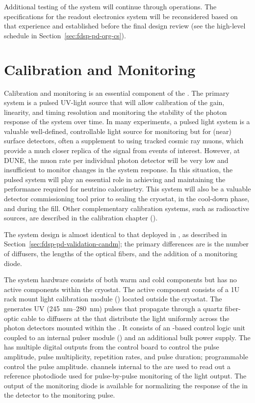 Additional testing of the system will continue through  operations. The specifications for the readout electronics system will be reconsidered based on that experience and established before the  final design review (see the high-level schedule in Section~\ref{sec:fdsp-pd-org-cs}). 


\section{Calibration and Monitoring}
\label{sec:fdsp-pd-CandM}

Calibration and monitoring is an essential component of the .
The primary system is a pulsed UV-light source that will allow calibration of the  gain, linearity, and timing resolution and monitoring the stability of the photon response of the system over time.
In many experiments, a pulsed light system is a valuable well-defined, controllable light source for monitoring but for (near) surface detectors, often a supplement to using tracked cosmic ray muons, which provide a much closer replica of the signal from events of interest. 
However, at DUNE, the muon rate per individual photon detector will be very low and insufficient to monitor changes in the system response. In this situation, the pulsed system will play an essential role in achieving and maintaining the  performance required for neutrino calorimetry. 
This system will also be a valuable detector commissioning tool prior to sealing the cryostat, in the cool-down phase, and during the \lar fill.
Other complementary calibration systems, such as radioactive sources, are described in the calibration chapter (\spchcalib). 

The system design is almost identical to that deployed in , as described in Section~\ref{sec:fdsp-pd-validation-candm}; the primary differences are is the number of diffusers, the lengths of the optical fibers, and the addition of a monitoring diode.

The system hardware consists of both warm and cold components but has no active components within the cryostat. The active component consists of a 1U rack mount light calibration module () located outside the cryostat. The  generates UV (\SIrange{245}{280}{nm}) pulses that propagate through a quartz fiber-optic cable to diffusers at the  that distribute the light uniformly across the photon detectors mounted within the . 
It consists of an -based control logic unit coupled to an internal  pulser module () and an additional bulk power supply. 
The  has multiple digital outputs from the control board to control the pulse amplitude, pulse multiplicity, repetition rates, and pulse duration; programmable  control the  pulse amplitude.  channels internal to the  are used to read out a reference photodiode used for pulse-by-pulse monitoring of the  light output. The output of the monitoring diode is available for normalizing the response of the  in the detector to the monitoring pulse. 


